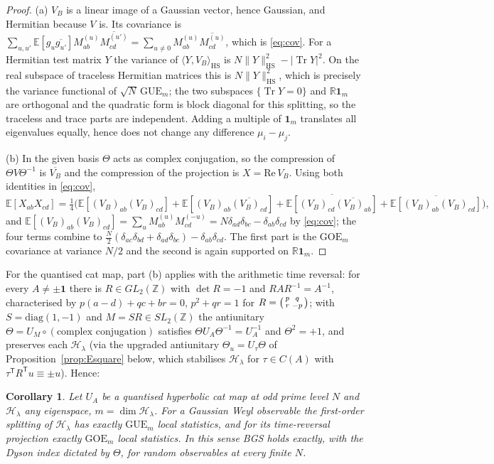 \documentclass[11pt,reqno]{amsart}
\newtheorem{corollary}[theorem]{Corollary}
\theoremstyle{definition}
\DeclareMathOperator{\Tr}{Tr}
\DeclareMathOperator{\HS}{HS}
\newcommand{\ZZ}{\mathbb{Z}}
\newcommand{\RR}{\mathbb{R}}
\newcommand{\HH}{\mathcal{H}}
\newcommand{\GUE}{\mathrm{GUE}}
\newcommand{\GOE}{\mathrm{GOE}}
\begin{document}
\begin{proof}
(a) $V_B$ is a linear image of a Gaussian vector, hence Gaussian, and Hermitian
because $V$ is. Its covariance is
$\sum_{u,u'}\mathbb E[g_u\overline{g_{u'}}]M^{(u)}_{ab}\overline{M^{(u')}_{cd}}
=\sum_{u\neq0}M^{(u)}_{ab}\overline{M^{(u)}_{cd}}$, which is \eqref{eq:cov}. For
a Hermitian test matrix $Y$ the variance of $\langle Y,V_B\rangle_{\HS}$ is
$N\|Y\|_{\HS}^2-|\Tr Y|^2$. On the real subspace of traceless Hermitian matrices
this is $N\|Y\|_{\HS}^2$, which is precisely the variance functional of
$\sqrt N\,\GUE_m$; the two subspaces $\{\Tr Y=0\}$ and $\RR\mathbf 1_m$ are
orthogonal and the quadratic form is block diagonal for this splitting, so the
traceless and trace parts are independent. Adding a multiple of $\mathbf 1_m$
translates all eigenvalues equally, hence does not change any difference
$\mu_i-\mu_j$.

(b) In the given basis $\Theta$ acts as complex conjugation, so the compression
of $\Theta V\Theta^{-1}$ is $\overline{V_B}$ and the compression of the
projection is $X=\mathrm{Re}\,V_B$. Using both identities in \eqref{eq:cov},
\[
  \mathbb E[X_{ab}X_{cd}]=\tfrac14\bigl(
   \mathbb E[(V_B)_{ab}(V_B)_{cd}]+\mathbb E[(V_B)_{ab}\overline{(V_B)_{cd}}]
   +\overline{\mathbb E[(V_B)_{cd}\overline{(V_B)_{ab}}]}
   +\overline{\mathbb E[(V_B)_{ab}(V_B)_{cd}]}\bigr),
\]
and $\mathbb E[(V_B)_{ab}(V_B)_{cd}]
=\sum_u M^{(u)}_{ab}M^{(-u)}_{cd}=N\delta_{ad}\delta_{bc}-\delta_{ab}\delta_{cd}$
by \eqref{eq:cov}; the four terms combine to
$\tfrac N2(\delta_{ac}\delta_{bd}+\delta_{ad}\delta_{bc})-\delta_{ab}\delta_{cd}$.
The first part is the $\GOE_m$ covariance at variance $N/2$ and the second is
again supported on $\RR\mathbf 1_m$.
\end{proof}

For the quantised cat map, part (b) applies with the arithmetic time reversal:
for every $A\neq\pm\mathbf 1$ there is $R\in GL_2(\ZZ)$ with $\det R=-1$ and
$RAR^{-1}=A^{-1}$, characterised by $p(a-d)+qc+br=0$, $p^2+qr=1$ for
$R=\begin{psmallmatrix}p&q\\r&-p\end{psmallmatrix}$; with $S=\mathrm{diag}(1,-1)$
and $M=SR\in SL_2(\ZZ)$ the antiunitary $\Theta=U_M\circ(\text{complex
conjugation})$ satisfies $\Theta U_A\Theta^{-1}=U_A^{-1}$ and $\Theta^2=+1$, and
preserves each $\HH_\lambda$ (via the upgraded antiunitary
$\Theta_u=U_\tau\Theta$ of Proposition~\ref{prop:Esquare} below, which
stabilises $\HH_\lambda$ for $\tau\in C(A)$ with $\tau^{\mathsf T}R^{\mathsf T}u\equiv\pm u$).
Hence:
\begin{corollary}\label{cor:bgs-random}
Let $U_A$ be a quantised hyperbolic cat map at odd prime level $N$ and
$\HH_\lambda$ any eigenspace, $m=\dim\HH_\lambda$. For a Gaussian Weyl
observable the first-order splitting of $\HH_\lambda$ has exactly $\GUE_m$ local
statistics, and for its time-reversal projection exactly $\GOE_m$ local
statistics. In this sense BGS holds \emph{exactly}, with the Dyson index
dictated by $\Theta$, for random observables at every finite $N$.
\end{corollary}
\end{document}
